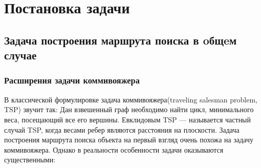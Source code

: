 \chapter{Постановка задачи}
\label{chapSVD}

\section{Задача построения маршрута поиска в oбщeм случае}


\subsection{Расширения задачи коммивояжера}
В классической формулировке задача коммивояжера(traveling salesman problem, TSP) звучит так:
 Дан взвешенный граф необходимо найти цикл, минимального веса, посещающий все его вершины.
 Евклидовым TSP --- называется частный случай TSP, когда весами ребер являются
расстояния на плоскости. 
 Задача построения маршрута поиска объекта на первый взгляд очень похожа на задачу коммивояжера.
Однако в реальности особенности задачи оказываются существенными:
